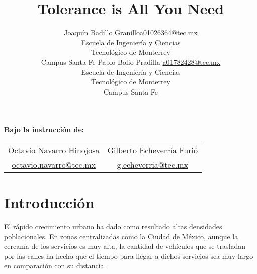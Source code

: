 \documentclass[twoside,11pt]{article}
\newcommand{\myname}{Joaquín Badillo Granillo}
\begin{document}
\renewcommand{\tablename}{Tabla}

\title{Tolerance is All You Need}

\author{\name \myname \email \href{mailto:a01026364@tec.mx}{a01026364@tec.mx} \\
       \addr Escuela de Ingeniería y Ciencias\\
       Tecnológico de Monterrey\\
       Campus Santa Fe
       \AND
       \name Pablo Bolio Pradilla \email \href{mailto:a01782428@tec.mx}{a01782428@tec.mx} \\
       \addr Escuela de Ingeniería y Ciencias\\
       Tecnológico de Monterrey\\
       Campus Santa Fe
       }

\maketitle

\vspace{-16pt}

\begin{center}
  \textbf{Bajo la instrucción de:}
  
  \vspace{8pt}

  \begin{tabular}{cc}
    \hspace{34pt}Octavio Navarro Hinojosa\hspace{34pt} & \hspace{34pt}Gilberto Echeverría Furió\hspace{34pt} \\
    \href{mailto:octavio.navarro@tec.mx}{octavio.navarro@tec.mx} & \href{mailto:g.echeverria@tec.mx}{g.echeverria@tec.mx} 
  \end{tabular}
\end{center}

  \vspace{14pt}

\section{Introducción}
El rápido crecimiento urbano ha dado como resultado altas densidades poblacionales.
En zonas centralizadas como la Ciudad de México, aunque la cercanía de los servicios
es muy alta, la cantidad de vehículos que se trasladan por las calles ha hecho que
el tiempo para llegar a dichos servicios sea muy largo en comparación con su distancia.
\end{document}
